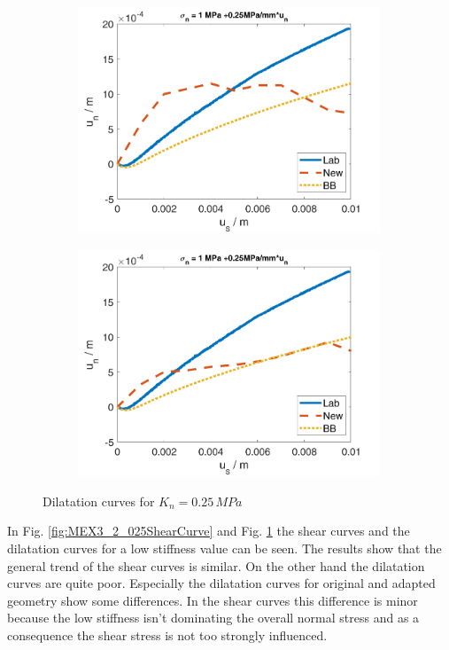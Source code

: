 \begin{figure}
\begin{subfigure}[c]{0.48\textwidth}
\includegraphics[width=0.99\textwidth]{./figures/MEX3-2_025DilationOrig.png}
\end{subfigure}
\begin{subfigure}[c]{0.48\textwidth}
\includegraphics[width=0.99\textwidth]{./figures/MEX3-2_025DilationWithout.png}
\end{subfigure}
\caption{Dilatation curves for $K_n=0.25\,\unit{MPa}$}
\label{fig:MEX3-2_025Dilation}
\end{figure}

In Fig. \ref{fig:MEX3_2_025ShearCurve} and Fig. \ref{fig:MEX3-2_025Dilation} the shear curves and the dilatation curves for a low stiffness value can be seen. The results show that the general trend of the shear curves is similar. On the other hand the dilatation curves are quite poor. Especially the dilatation curves for original and adapted geometry show some differences. In the shear curves this difference is minor because the low stiffness isn't dominating the overall normal stress and as a consequence the shear stress is not too strongly influenced.

